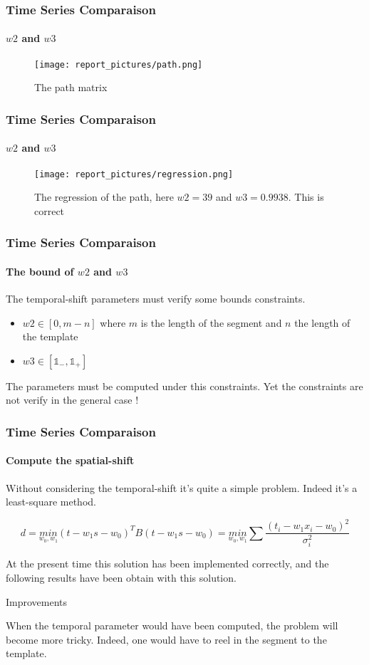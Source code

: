 \documentclass[11pt, sans, handout]{beamer}
\newcommand{\Un}{\mathbb{1}}
\begin{document}
\begin{frame}
	\frametitle{Time Series Comparaison}
	\framesubtitle{$w2$ and $w3$}
	
	\begin{figure}[H]
		\centering
		\texttt{[image: report\_pictures/path.png]}
		\caption{The path matrix}
		\label{ex_dist_rep}
	\end{figure}
	
\end{frame}


\begin{frame}
	\frametitle{Time Series Comparaison}
	\framesubtitle{$w2$ and $w3$}
	
	\begin{figure}[H]
		\centering
		\texttt{[image: report\_pictures/regression.png]}
		\caption{The regression of the path, here $w2=39$ and $w3=0.9938$. This is correct}
		\label{ex_dist_rep}
	\end{figure}

\end{frame}

\begin{frame}
	\frametitle{Time Series Comparaison}
	\framesubtitle{The bound of $w2$ and $w3$}
	
	The temporal-shift parameters must verify some bounds constraints.
	
	\begin{itemize}
	\item $w2 \in [0, m-n]$ where $m$ is the length of the segment and $n$ the length of the template	
	\item $w3 \in [\Un_{-}, \Un_{+}]$
	

	\end{itemize}
	
	The parameters must be computed under this constraints. Yet the constraints are not verify in the general case ! 
	
\end{frame}

\begin{frame}
	\frametitle{Time Series Comparaison}
	\framesubtitle{Compute the spatial-shift}
	
	Without considering the temporal-shift it's quite a simple problem. Indeed it's a least-square method.
	
	\[ d = \underset{w_0,w_1}{min} (t - w_1 s - w_0)^T B (t - w_1 s - w_0) = \underset{w_0,w_1}{min} \sum \frac{(t_i - w_1 x_i - w_0)^2}{\sigma_i^2} \]
	
	At the present time this solution has been implemented correctly, and the following results have been obtain with this solution.
	
	\begin{exampleblock}{Improvements}
	
	When the temporal parameter would have been computed, the problem will become more tricky. Indeed, one would have to reel in the segment to the template.
	\end{exampleblock}
	
\end{frame}
\end{document}

